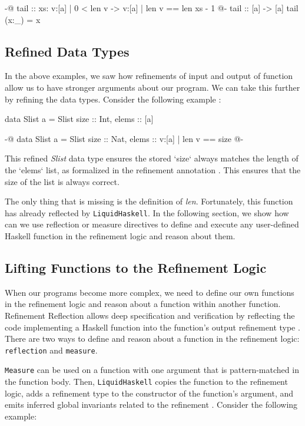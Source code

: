 \documentclass[]{rptuseminar}
\begin{document}
\begin{haskell}
 {-@ tail :: xs: {v:[a] | 0 < len v} -> {v:[a] | len v == len xs - 1} @-}
 tail :: [a] -> [a]
 tail (x:_) = x
\end{haskell}

\subsection{Refined Data Types}
In the above examples, we saw how refinements of input and output of function allow us to have stronger arguments about our program. 
We can take this further by refining the data types. Consider the following example \cite{jhala_programming_2020}:

\begin{haskell}
  data Slist a = Slist { size :: Int, elems :: [a] }

  {-@ data Slist a = Slist { size :: Nat, elems :: {v:[a] | len v == size} } @-}
\end{haskell}

This refined \textit{Slist} data type ensures the stored `size` always matches the length of the `elems` list, 
as formalized in the refinement annotation \cite{jhala_programming_2020}. 
This ensures that the size of the list is always correct.

The only thing that is missing is the definition of \textit{len}. Fortunately, this function has already reflected by
\texttt{LiquidHaskell}. In the following section, we show how can we use reflection or measure directives to define and execute any user-defined Haskell function in the refinement logic and
reason about them.

\subsection{Lifting Functions to the Refinement Logic}
\label{sec:reflection}
When our programs become more complex, we need to define our own functions in the refinement logic and reason about
a function within another function. Refinement Reflection allows deep specification and verification by 
reflecting the code implementing a Haskell function into the function’s output refinement type \cite{niki_blog_2016}.
There are two ways to define and reason about a function in the refinement logic: \texttt{reflection} and \texttt{measure}. 

\texttt{Measure} can be used on a function with one argument that is pattern-matched in the function body. Then,
\texttt{LiquidHaskell} copies the function to the refinement logic, adds a refinement type to the constructor of the function's argument, and emits inferred global
invariants related to the refinement \cite{niki_lecture_2024}. Consider the following example:
\end{document}
